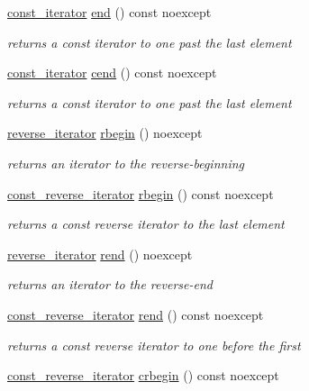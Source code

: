 \begin{DoxyCompactItemize}
\hyperlink{a00038}{const\+\_\+iterator} \hyperlink{a00025_a68f0a8c4618d57523384ec7ecd2f5819}{end} () const  noexcept
\begin{DoxyCompactList}\small\item\em returns a const iterator to one past the last element \end{DoxyCompactList}\item 
\hyperlink{a00038}{const\+\_\+iterator} \hyperlink{a00025_a19dfb04c297ffb5f0ef84abfa4a5a087}{cend} () const  noexcept
\begin{DoxyCompactList}\small\item\em returns a const iterator to one past the last element \end{DoxyCompactList}\item 
\hyperlink{a00025_a2f1f83aa187a56dc5ec7a7027065ac8a}{reverse\+\_\+iterator} \hyperlink{a00025_a62ccf5b9b3674aec2403fbc02da03db8}{rbegin} () noexcept
\begin{DoxyCompactList}\small\item\em returns an iterator to the reverse-\/beginning \end{DoxyCompactList}\item 
\hyperlink{a00025_ae336fff01f4b78e3e16e5008dc8dbc00}{const\+\_\+reverse\+\_\+iterator} \hyperlink{a00025_a4635e8c6d5a4599f12a76368e325acd8}{rbegin} () const  noexcept
\begin{DoxyCompactList}\small\item\em returns a const reverse iterator to the last element \end{DoxyCompactList}\item 
\hyperlink{a00025_a2f1f83aa187a56dc5ec7a7027065ac8a}{reverse\+\_\+iterator} \hyperlink{a00025_aaa160a960dd3dd90856a72b1d8dbe707}{rend} () noexcept
\begin{DoxyCompactList}\small\item\em returns an iterator to the reverse-\/end \end{DoxyCompactList}\item 
\hyperlink{a00025_ae336fff01f4b78e3e16e5008dc8dbc00}{const\+\_\+reverse\+\_\+iterator} \hyperlink{a00025_a018ea61dbc973192d2ffc6bccc50696b}{rend} () const  noexcept
\begin{DoxyCompactList}\small\item\em returns a const reverse iterator to one before the first \end{DoxyCompactList}\item 
\hyperlink{a00025_ae336fff01f4b78e3e16e5008dc8dbc00}{const\+\_\+reverse\+\_\+iterator} \hyperlink{a00025_a43c08a393368eb674d0dcdbe301aafe3}{crbegin} () const  noexcept

\end{DoxyCompactItemize}
